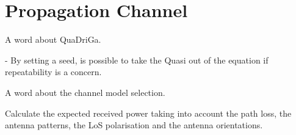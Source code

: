 \section{Propagation Channel}
\label{sec:propagation_channel}


A word about QuaDriGa.

- By setting a seed, is possible to take the Quasi out of the equation if repeatability is a concern.


A word about the channel model selection.






Calculate the expected received power taking into account the path loss, the antenna patterns, the LoS polarisation and the antenna orientations.